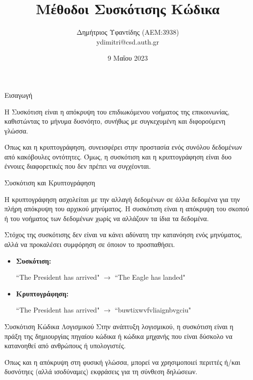 \documentclass[xcolor=dvipsnames]{beamer}
\title{\gt Μέθοδοι Συσκότισης Κώδικα}
\author{Δημήτριος Υφαντίδης (ΑΕΜ:3938)\\
\lt ydimitri@csd.auth.gr}
\institute{Αριστοτέλειο Πανεπιστήμιο Θεσσαλονίκης, \\
Τμήμα Πληροφορικής της Σχολής Θετικών Επιστημών}
\date{9 Μαΐου 2023}
\newcommand{\lt}{\latintext}
\newcommand{\gt}{\greektext}
\begin{document}
\frame{\titlepage}

\begin{frame}{Εισαγωγή}

Η Συσκότιση είναι η απόκρυψη του επιδιωκόμενου νοήματος της επικοινωνίας, καθιστώντας το μήνυμα δυσνόητο, συνήθως με συγκεχυμένη και διφορούμενη γλώσσα. 

\hfill

Όπως και η κρυπτογράφηση, συνεισφέρει στην προστασία ενός συνόλου δεδομένων από κακόβουλες οντότητες. Όμως, η συσκότιση και η κρυπτογράφηση είναι δυο έννοιες διαφορετικές  που δεν πρέπει να συγχέονται.

\end{frame}

\begin{frame}{Συσκότιση και Κρυπτογράφηση}

Η κρυπτογράφηση ασχολείται με την αλλαγή δεδομένων  σε άλλα δεδομένα για την πλήρη απόκρυψη του αρχικού μηνύματος. Η συσκότιση είναι η απόκρυψη του σκοπού ή του νοήματος των δεδομένων χωρίς να αλλάζουν τα ίδια τα δεδομένα. 

\hfill

Στόχος της συσκότισης δεν είναι να κάνει αδύνατη την κατανόηση ενός μηνύματος, αλλά να προκαλέσει συμφόρηση σε όποιον το προσπαθήσει.

\hfill 

{\lt
\begin{itemize}
	\item \textbf{\gt Συσκότιση: } 
	
	``The President has arrived" $\rightarrow$ ``The Eagle has landed"
	
	\item \textbf{\gt Κρυπτογράφηση: } 
	
	``The President has arrived" $\rightarrow$ ``buwtixwvfvliaignbvgciu"
\end{itemize}
}
\end{frame}

\begin{frame}{Συσκότιση Κώδικα Λογισμικού}
Στην ανάπτυξη λογισμικού, η συσκότιση είναι η πράξη της δημιουργίας πηγαίου κώδικα ή κώδικα μηχανής που είναι δύσκολο να κατανοηθεί από ανθρώπους ή υπολογιστές. 

\hfill

Όπως και η απόκρυψη στη φυσική γλώσσα, μπορεί να χρησιμοποιεί περιττές ή/και δυσνότηες (αλλά ισοδύναμες) εκφράσεις για τη σύνθεση δηλώσεων. 

\end{frame}
\end{document}
